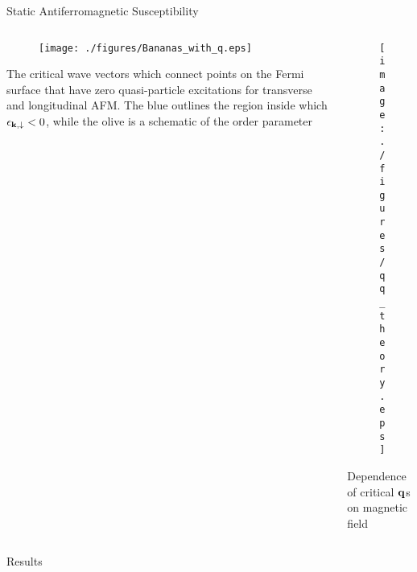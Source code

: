 \documentclass{beamer} %
\begin{document}
\begin{frame}{}
\begin{columns}[t]
\begin{column}{.59\textwidth}
\begin{block}{\centering\veryHuge Static Antiferromagnetic Susceptibility}
			\begin{framed}
			\begin{columns}[t]
				\begin{column}{0.47\textwidth}
					  \begin{figure}
					        \centering
					                \texttt{[image: ./figures/Bananas\_with\_q.eps]}
					 \end{figure}
					The critical wave vectors which connect points on the Fermi surface that have zero quasi-particle excitations for transverse 
					        and longitudinal AFM. The blue outlines the region inside which $\epsilon_{{\bf k},\downarrow}<0$, while the olive is a schematic of the order 
					        parameter
				\end{column}
				\hspace{1pt}
				\vrule
				\hspace{1pt}
				\begin{column}{0.47\textwidth}
					 \begin{figure}
					        \centering
					                \texttt{[image: ./figures/qq\_theory.eps]}
					
					 \end{figure}
					 Dependence of  critical ${\bf q}$s on magnetic field
				\end{column}
			\end{columns}
			\end{framed}
		\end{block}
	\end{column}
    \end{columns}
    \begin{block}{\centering\veryHuge Results} 			  \begin{columns}[t]
			  	

\end{columns}
\end{block}
\end{frame}
\end{document}
